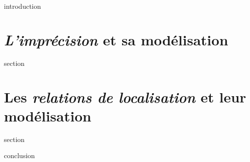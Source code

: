 
\chaptertoc{}

\label{sec:3-int}
{introduction}

\section{\emph{L'imprécision} et sa modélisation}
\label{sec:3-1}
{section}

\section{Les \emph{relations de localisation} et leur modélisation}
\label{sec:3-2}
{section}


\label{sec:3-cnc}
{conclusion}

